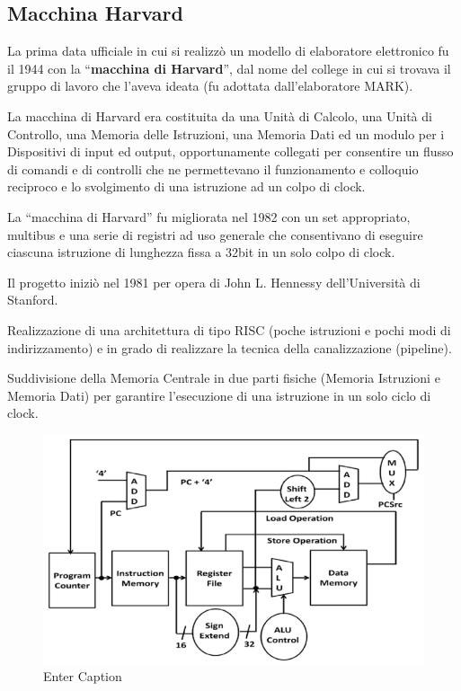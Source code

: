 \documentclass[12pt]{article}
\begin{document}
\subsection{Macchina Harvard}
La prima data ufficiale in cui si realizzò un modello di elaboratore elettronico fu il 1944 con la “\textbf{macchina di Harvard}”, dal nome del college in cui si trovava il gruppo di lavoro che l’aveva ideata (fu adottata dall’elaboratore MARK). \par\medskip\noindent
La macchina di Harvard era costituita da una Unità di Calcolo, una Unità di Controllo, una Memoria delle Istruzioni, una Memoria Dati ed un modulo per i Dispositivi di input ed output, opportunamente collegati per consentire un flusso di comandi e di controlli che ne permettevano il funzionamento e colloquio reciproco e lo svolgimento di una istruzione ad un colpo di clock.\par\medskip\noindent
La “macchina di Harvard” fu migliorata nel 1982 con un set appropriato, multibus e una serie di registri ad uso generale che consentivano di eseguire ciascuna istruzione di lunghezza fissa a 32bit in un solo colpo di clock.\par\medskip\noindent
Il progetto iniziò nel 1981 per opera di John L. Hennessy dell’Università di Stanford.\par\medskip\noindent
Realizzazione di una architettura di tipo RISC (poche istruzioni e pochi modi di indirizzamento) e in grado di realizzare la tecnica della canalizzazione (pipeline).\par\medskip\noindent
Suddivisione della Memoria Centrale in due parti fisiche (Memoria Istruzioni e Memoria Dati) per garantire l'esecuzione di una istruzione in un solo ciclo di clock.\par\medskip\noindent 
\begin{figure}[h]
    \centering
    \includegraphics[width=0.75\linewidth]{harvard.png}
    \caption{Enter Caption}
    \label{fig:enter-label}
\end{figure}
\end{document}
